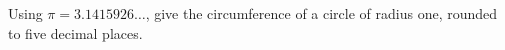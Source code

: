 Using $\pi=3.1415926\ldots$, give the circumference of a circle of radius one, rounded to five decimal places.
